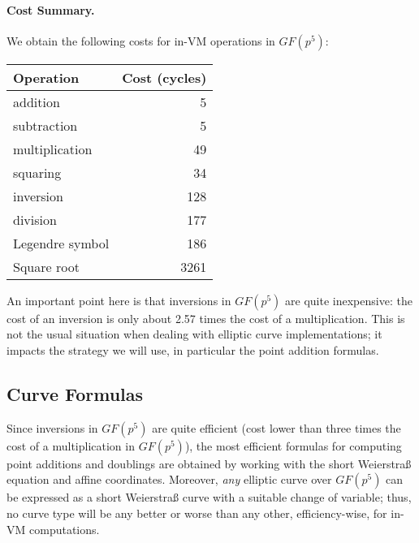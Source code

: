\documentclass{llncs}
\newcommand{\GF}{GF}
\begin{document}
\paragraph{Cost Summary.} We obtain the following costs for in-VM
operations in $\GF(p^5)$:
\begin{center}
    \begin{tabular}{|l|r|}
        \hline
        \textsf{\textbf{Operation}} & \textsf{\textbf{Cost (cycles)}} \\
        \hline
        addition         &    5 \\
        subtraction      &    5 \\
        multiplication   &   49 \\
        squaring         &   34 \\
        inversion        &  128 \\
        division         &  177 \\
        Legendre symbol  &  186 \\
        Square root      & 3261 \\
        \hline
    \end{tabular}
\end{center}
An important point here is that inversions in $\GF(p^5)$ are quite
inexpensive: the cost of an inversion is only about 2.57 times the
cost of a multiplication. This is not the usual situation when
dealing with elliptic curve implementations; it impacts the strategy
we will use, in particular the point addition formulas.

\subsection{Curve Formulas}\label{sec:invm-curve-formulas}

Since inversions in $\GF(p^5)$ are quite efficient (cost lower than
three times the cost of a multiplication in $\GF(p^5)$), the most
efficient formulas for computing point additions and doublings are
obtained by working with the short Weierstraß equation and affine
coordinates. Moreover, \emph{any} elliptic curve over $\GF(p^5)$ can be
expressed as a short Weierstraß curve with a suitable change of
variable; thus, no curve type will be any better or worse than any
other, efficiency-wise, for in-VM computations.
\end{document}
